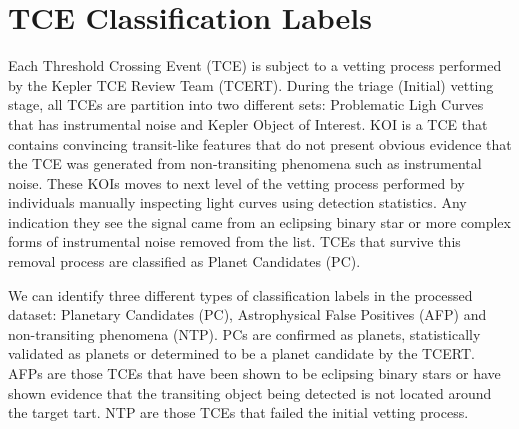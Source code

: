 

\section{TCE Classification Labels}

Each Threshold Crossing Event (TCE) is subject to a vetting process performed by the Kepler TCE Review Team (TCERT). During the triage (Initial) vetting stage, all TCEs are partition into two different sets: Problematic Ligh Curves that has instrumental noise and Kepler Object of Interest. KOI is a TCE that contains convincing transit-like features that do not present obvious evidence that the TCE was generated from non-transiting phenomena such as instrumental noise. These KOIs moves to next level of the vetting process performed by individuals manually inspecting light curves using detection statistics. Any indication they see the signal came from an eclipsing binary star or more complex forms of instrumental noise removed from the list. TCEs that survive this removal process are classified as Planet Candidates (PC).


We can identify three different types of classification labels in the processed dataset: Planetary Candidates (PC), Astrophysical False Positives (AFP) and non-transiting phenomena (NTP). PCs are confirmed as planets, statistically validated as planets or determined to be a planet candidate by the TCERT. AFPs are those TCEs that have been shown to be eclipsing binary stars or have shown evidence that the transiting object being detected is not located around the target tart. NTP are those TCEs that failed the initial vetting process.

